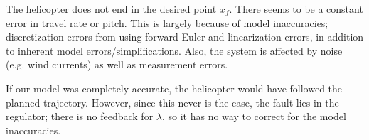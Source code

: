 The helicopter does not end in the desired point $x_f$. There seems to be a constant error in travel rate or pitch. This is largely  because of model inaccuracies; discretization errors from using forward Euler and linearization errors, in addition to inherent model errors/simplifications. Also, the system is affected by noise (e.g. wind currents) as well as measurement errors.

If our model was completely accurate, the helicopter would have followed the planned trajectory. However, since this never is the case, the fault lies in the regulator; there is no feedback for $\lambda$, so it has no way to correct for the model inaccuracies.

